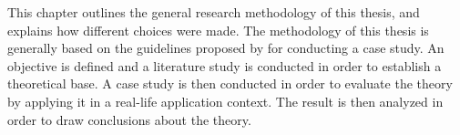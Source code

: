 
This chapter outlines the general research methodology of this thesis,
and explains how different choices were made. The methodology of this
thesis is generally based on the guidelines proposed by
\citet{article:casestudies} for conducting a case study. An objective is
defined and a literature study is conducted in order to establish a
theoretical base. A case study is then conducted in order to evaluate
the theory by applying it in a real-life application context. The result
is then analyzed in order to draw conclusions about the theory.
